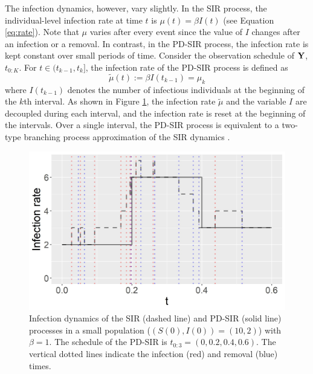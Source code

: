 \documentclass[11pt]{article}
\begin{document}
	The infection dynamics, however, vary slightly.
	In the SIR process, the individual-level infection rate at time $t$ is $\mu(t) = \beta I(t)$ (see Equation \eqref{eq:rate}).
	Note that $\mu$ varies after every event since the value of $I$ changes after an infection or a removal.
	In contrast, in the PD-SIR process, the infection rate is kept constant over small periods of time. Consider the observation schedule of $\mathbf{Y}$, $t_{0:K}$. For $t \in (t_{k-1}, t_k]$, the infection rate of the PD-SIR process is defined as
	$$\tilde{\mu}(t) := \beta I(t_{k - 1}) = \mu_k$$
	where $I(t_{k-1})$ denotes the number of infectious individuals at the beginning of the $k$th interval. As shown in Figure \ref{fig:mu}, the infection rate $\tilde{\mu}$ and the variable $I$ are decoupled during each interval, and the infection rate is reset at the beginning %
	of the intervals. Over a single interval, the PD-SIR process is equivalent to a two-type branching process approximation of the SIR dynamics \cite{Ho.2018}. 
	
	\begin{figure}
		\centering
		\includegraphics[scale = 0.4]{infection_rate_SIR_PDSIR.jpg}
		\caption{Infection dynamics of the SIR (dashed line) and PD-SIR (solid line) processes in a small population ($(S(0), I(0)) = (10,2)$) with $\beta=1$. The schedule of the PD-SIR is $t_{0:3}=(0, 0.2, 0.4, 0.6)$.
		The vertical dotted lines indicate the infection (red) and removal (blue) times.}
		\label{fig:mu}
	\end{figure}
	
\end{document}
